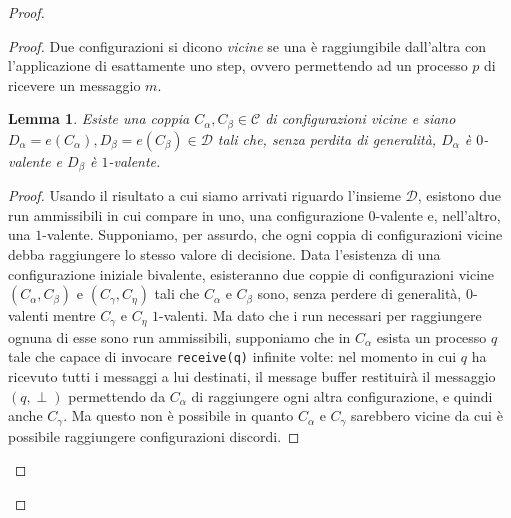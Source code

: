 \documentclass{article}
\newtheorem{lemma}{Lemma}
\begin{document}
\begin{proof}
\begin{proof}
Due configurazioni si dicono \emph{vicine} se una è raggiungibile
dall'altra con l'applicazione di esattamente uno step, ovvero
permettendo ad un processo $p$ di ricevere un messaggio $m$.

\begin{lemma}
  Esiste una coppia $C_{\alpha}, C_{\beta} \in \mathcal{C}$ di
  configurazioni vicine e siano $D_{\alpha} = e(C_{\alpha}), D_{\beta}
  = e (C_{\beta})\in \mathcal{D}$ tali che, senza perdita di
  generalit\`a, $D_{\alpha}$ \`e $0$-valente e $D_{\beta}$ \`e
  $1$-valente.
\end{lemma}
\begin{proof}
  Usando il risultato a cui siamo arrivati riguardo l'insieme
  $\mathcal{D}$, esistono due run ammissibili in cui compare in uno,
  una configurazione $0$-valente e, nell'altro, una
  $1$-valente. Supponiamo, per assurdo, che ogni coppia di
  configurazioni vicine debba raggiungere lo stesso valore di
  decisione. Data l'esistenza di una configurazione iniziale
  bivalente, esisteranno due coppie di configurazioni vicine
  $(C_{\alpha}, C_{\beta})$ e $(C_{\gamma}, C_{\eta})$ tali che
  $C_{\alpha}$ e $C_{\beta}$ sono, senza perdere di generalit\`a,
  $0$-valenti mentre $C_{\gamma}$ e $C_{\eta}$ $1$-valenti. Ma dato
  che i run necessari per raggiungere ognuna di esse sono run
  ammissibili, supponiamo che in $C_{\alpha}$ esista un processo $q$
  tale che capace di invocare \texttt{receive(q)} infinite volte: nel
  momento in cui $q$ ha ricevuto tutti i messaggi a lui destinati, il
  message buffer restituir\`a il messaggio $(q, \perp)$ permettendo da
  $C_{\alpha}$ di raggiungere ogni altra configurazione, e quindi
  anche $C_{\gamma}$. Ma questo non \`e possibile in quanto
  $C_{\alpha}$ e $C_{\gamma}$ sarebbero vicine da cui \`e possibile
  raggiungere configurazioni discordi.
\end{proof}




\end{proof}
\end{proof}
\end{document}
